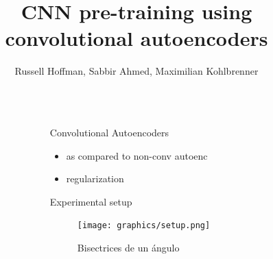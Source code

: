 \documentclass[final]{beamer}
\title{CNN pre-training using convolutional autoencoders} %
\author{Russell Hoffman, Sabbir Ahmed, Maximilian Kohlbrenner } %
\institute{TU Berlin} %
\newlength{\sepwid}
\newlength{\onecolwid}
\begin{document}

\setlength{\belowcaptionskip}{2ex} %
\setlength\belowdisplayshortskip{2ex} %

\begin{frame}[t] %

\begin{columns}[t] %

\begin{column}{\sepwid}\end{column} %

\begin{column}{\onecolwid} %


\begin{block}{Convolutional Autoencoders}

\begin{itemize}
	\item as compared to non-conv autoenc
	\item regularization
\end{itemize}

\end{block}


\begin{block}{Experimental setup}

\begin{figure}
\texttt{[image: graphics/setup.png]}
\caption{Bisectrices de un ángulo}
\end{figure}

\end{block}



\end{column}
\end{columns}
\end{frame}
\end{document}
